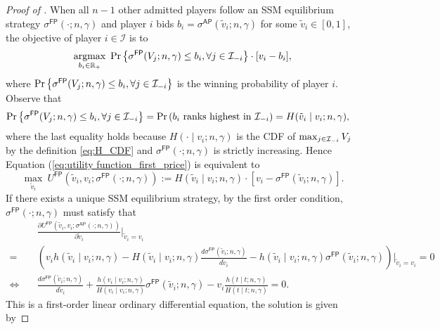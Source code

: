 \begin{proof}[Proof of ]
\noindent When all $n-1$ other admitted players follow an SSM equilibrium strategy $\sigma^{\mathsf{FP}}(\cdot;n,\gamma)$ and player $i$ bids $ b_i =  \sigma^{\mathsf{AP}}(\tilde{v}_i;n,\gamma)$ for some $\tilde{v}_i\in[0,1]$, the objective of player $i \in \mathcal{I}$ is to
\begin{align}\label{eq:utility function_first_price}
    \operatorname*{\text{argmax}}_{b_i\in \mathbb{R}_+}~  \Pr\left\{\sigma^{\mathsf{FP}}({V}_j;n,\gamma)\leq b_i,\forall j\in \mathcal{I}_{-i}\right\} \cdot [v_i - b_i],
\end{align}
where $\Pr\left\{\sigma^{\mathsf{FP}}({V}_j;n,\gamma)\leq b_i,\forall j\in \mathcal{I}_{-i}\right\}$ is the winning probability of player $i$.  Observe that 
\begin{align*}
    \Pr\left\{\sigma^{\mathsf{FP}}({V}_j;n,\gamma)\leq b_i,\forall j\in \mathcal{I}_{-i}\right\} & = \Pr\left(\text{$b_i$ ranks  highest in $\mathcal{I}_{-i}$} \right) \nonumber = H(\tilde{v}_i\mid v_i;n,\gamma),
\end{align*}
where the last equality holds because $H(\cdot \mid v_i;n,\gamma)$ is the CDF of $\max_{j\in \mathcal{I}_{-i}}V_j$ by the definition \eqref{eq:H_CDF} and $\sigma^{\mathsf{FP}}(\cdot;n,\gamma)$ is strictly increasing. Hence Equation (\ref{eq:utility function_first_price}) is equivalent to 
\begin{equation*}
\max_{\tilde{v}_i}~U^{\mathsf{FP}}(\tilde{v}_i,v_i;\sigma^{\mathsf{FP}}(\cdot;n,\gamma)):=  H(\tilde{v}_i\mid v_i; n,\gamma) \cdot \left[ v_i- \sigma^{\mathsf{FP}}(\tilde{v}_i;n,\gamma)\right].
\end{equation*}
If there exists a unique SSM equilibrium strategy, by the first order condition, $\sigma^{\mathsf{FP}}(\cdot;n,\gamma)$ must satisfy that\
\begin{align*}
    &\frac{\partial U^{\mathsf{FP}}(\tilde{v}_i,v_i;\sigma^{\mathsf{AP}}(\cdot;n,\gamma))}{\partial \tilde{v}_i}\bigg |_{\tilde{v}_i = v_i}\\
    =& \left(v_ih(\tilde{v}_i\mid v_i; n,\gamma) - H(\tilde{v}_i\mid v_i; n,\gamma) \frac{d \sigma^{\mathsf{FP}}(\tilde{v}_i;n,\gamma)}{d\tilde{v}_i} - h(\tilde{v}_i\mid v_i; n,\gamma)\sigma^{\mathsf{FP}}(\tilde{v}_i;n,\gamma)\right)\bigg |_{\tilde{v}_i = v_i} = 0\\
    \Longleftrightarrow\quad & \frac{d \sigma^{\mathsf{FP}}(\tilde{v}_i;n,\gamma)}{d\tilde{v}_i} + \frac{h({v}_i\mid v_i; n,\gamma)}{H({v}_i\mid v_i; n,\gamma)}\sigma^{\mathsf{FP}}(\tilde{v}_i;n,\gamma)-v_i\frac{h(t\mid t;n,\gamma)}{H(t\mid t;n,\gamma)} = 0.
\end{align*}
This is a first-order linear ordinary differential equation, the solution is given by

\end{proof}
